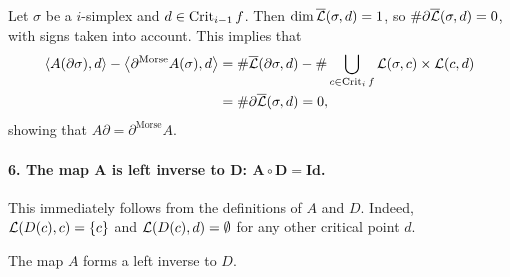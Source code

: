 \begin{myproof}
    Let $\sigma$ be a  $i$-simplex and $d \in \operatorname{Crit}_{i-1} f$.
    Then $\dim \overline{\mathcal L}(\sigma, d) = 1$, so  $\# \partial \overline{\mathcal L}(\sigma, d) = 0$, with signs taken into account.
    This implies that
    \begin{align*}
        \left<A(\partial \sigma), d \right> - \left<\partial^{\text{Morse}} A (\sigma) ,d\right> &= \# \overline{\mathcal L}(\partial \sigma, d) - \# \bigcup_{c \in  \operatorname{Crit}_i f} \mathcal L(\sigma, c) \times  \mathcal L(c, d)\\
                                                                                                 &= \# \partial \overline{\mathcal L}(\sigma, d) = 0
    ,\end{align*} 
    showing that $A \partial = \partial^{\text{Morse}} A$.


\paragraph{6. The map $\bm{A}$ is left inverse to $\bm{D}$: $\bm{A  \circ D = \text{Id}}$.}
    This immediately follows from the definitions of $A$ and $D$.
    Indeed, $\mathcal L(D(c), c) = \{c\}$ and $\mathcal L(D(c), d) = \emptyset$ for any other critical point $d$.
\begin{marginfigure}
    \centering
    \caption{The map $A$ forms a left inverse to $D$.}
    \label{fig:a-is-left-inverse-to-d}
\end{marginfigure}



\end{myproof}
